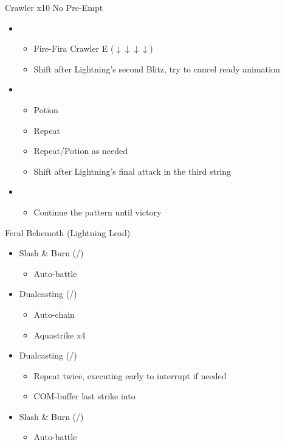 \begin{multicols}{2}
\begin{battle}{Crawler x10 No Pre-Empt}
\begin{itemize}
    \item \first
    \begin{itemize}
        \item Fire-Fira Crawler E ($\downarrow \downarrow \downarrow \downarrow$)
        \item Shift after Lightning's second Blitz, try to cancel ready animation
    \end{itemize}
    \item \sixth
    \begin{itemize}
        \item Potion
        \item Repeat
        \item Repeat/Potion as needed
        \item Shift after Lightning's final attack in the third string
    \end{itemize}
    \item \first
    \begin{itemize}
        \item Continue the pattern until victory
    \end{itemize}
\end{itemize}
\end{battle}
\vfill
\renewcommand{\first}{[1] Slash \& Burn (\com/\rav)}
\renewcommand{\second}{[2] War \& Peace (\com/\med)}
\renewcommand{\third}{[3] Supersoldier (\com/\syn)}
\renewcommand{\fourth}{[4] Dualcasting (\rav/\rav)}
\renewcommand{\fifth}{[5] Dualcasting (\rav/\rav)}
\renewcommand{\sixth}{[6] Slash \& Burn (\com/\rav)}
\begin{battle}{Feral Behemoth (Lightning Lead)}
\begin{itemize}
    \item \first
    \begin{itemize}
        \item Auto-battle
    \end{itemize}
    \item \fourth
    \begin{itemize}
        \item Auto-chain
        \item Aquastrike x4
    \end{itemize}
    \item \fifth
    \begin{itemize}
        \item Repeat twice, executing early to interrupt if needed
        \item COM-buffer last strike into
    \end{itemize}
    \item \sixth
    \begin{itemize}
        \item Auto-battle
    \end{itemize}
\end{itemize}
\end{battle}


\end{multicols}
